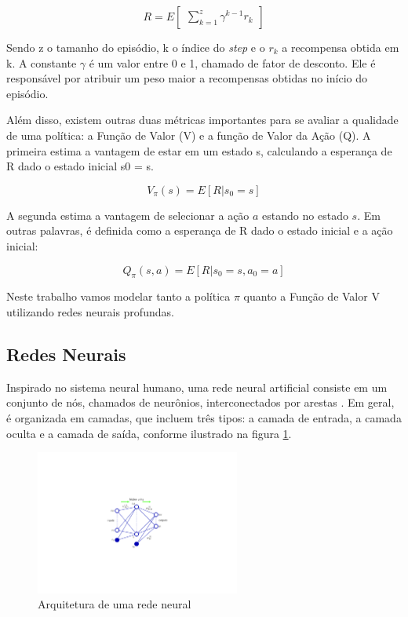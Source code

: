 \begin{equation}
    R = E\begin{bmatrix} \sum_{k=1}^{z} \gamma ^{k-1} r_k \end{bmatrix}
\end{equation}

\noindent
Sendo z o tamanho do episódio, k o índice do \textit{step} e o $r_k$ a recompensa obtida em k. A constante $\gamma$ é um valor entre 0 e 1, chamado de fator de desconto. Ele é responsável por atribuir um peso maior a recompensas obtidas no início do episódio. 

Além disso, existem outras duas métricas importantes para se avaliar a qualidade de uma política: a Função de Valor (V) e a função de Valor da Ação (Q). A primeira estima a vantagem de estar em um estado s, calculando a esperança de R dado o estado inicial s0 = s. 

\begin{equation}
    V_\pi(s) = E[R|s_0 = s]
\end{equation}

A segunda estima a vantagem de selecionar a ação $a$ estando no estado $s$. Em outras palavras, é definida como a esperança de R dado o estado inicial e a ação inicial:

\begin{equation}
    Q_\pi(s,a) = E[R|s_0 = s, a_0 = a]
\end{equation}


Neste trabalho vamos modelar tanto a política $\pi$ quanto a Função de Valor V utilizando redes neurais profundas. 

\subsection{Redes Neurais}
Inspirado no sistema neural humano, uma rede neural artificial consiste em um conjunto de nós, chamados de neurônios, interconectados por arestas \cite{Bishop}. 
Em geral, é organizada em camadas, que incluem três tipos: a camada de entrada, a camada oculta e a camada de saída, conforme ilustrado na figura \ref{arqNN}.

\begin{figure}[H]
     \centering
     \includegraphics[width=0.6\textwidth]{figuras/RedeNeural.pdf}
     \caption{Arquitetura de uma rede neural \cite{Bishop}}
     \label{arqNN}
\end{figure}


